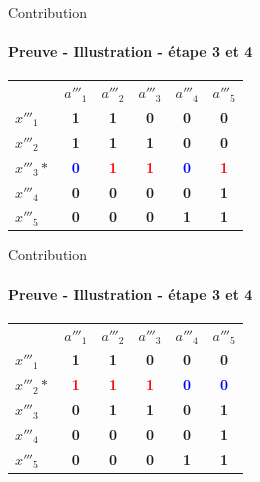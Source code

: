 \documentclass{beamer}
\begin{document}
 \begin{frame}{Contribution}
  \framesubtitle{Preuve - Illustration - étape 3 et 4}
\begin{table}[htb]
  \centering
\begin{tabular}{lccccc}
 & $a'''_1$ & $a'''_2$ & $a'''_3$ & $a'''_4$ & $a'''_5$\\
$x'''_1$ & \textbf{1} & \textbf{1} & \textbf{0} & \textbf{0} & \textbf{0}\\
$x'''_2$ & \textbf{1} & \textbf{1} & \textbf{1} & \textbf{0} & \textbf{0}\\
$x'''_3*$ & \textcolor{blue}{\textbf{0}} & \textcolor{red}{\textbf{1}} & \textcolor{red}{\textbf{1}} & \textcolor{blue}{\textbf{0}} & \textcolor{red}{\textbf{1}}\\
$x'''_4$ & \textbf{0} & \textbf{0} & \textbf{0} & \textbf{0} & \textbf{1}\\
$x'''_5$ & \textbf{0} & \textbf{0} & \textbf{0} & \textbf{1} & \textbf{1}

\end{tabular}
\end{table}
  \end{frame}

 \begin{frame}{Contribution}
  \framesubtitle{Preuve - Illustration - étape 3 et 4}
\begin{table}[htb]
  \centering
\begin{tabular}{lccccc}
 & $a'''_1$ & $a'''_2$ & $a'''_3$ & $a'''_4$ & $a'''_5$\\
$x'''_1$ & \textbf{1} & \textbf{1} & \textbf{0} & \textbf{0} & \textbf{0}\\
$x'''_2*$ & \textcolor{red}{\textbf{1}} & \textcolor{red}{\textbf{1}} & \textcolor{red}{\textbf{1}} & \textcolor{blue}{\textbf{0}} & \textcolor{blue}{\textbf{0}}\\
$x'''_3$ & \textbf{0} & \textbf{1} & \textbf{1} & \textbf{0} & \textbf{1}\\
$x'''_4$ & \textbf{0} & \textbf{0} & \textbf{0} & \textbf{0} & \textbf{1}\\
$x'''_5$ & \textbf{0} & \textbf{0} & \textbf{0} & \textbf{1} & \textbf{1}

\end{tabular}
\end{table}
  \end{frame}
\end{document}

